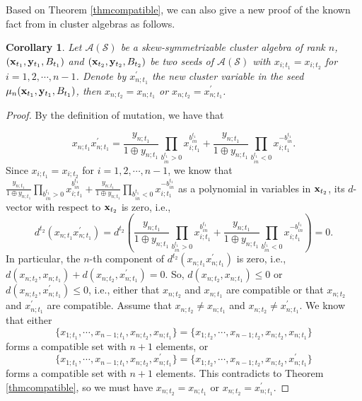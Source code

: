 \documentclass[14pt]{amsart}
\newtheorem{Corollary}[Theorem]{Corollary}
\begin{document}
Based on Theorem \ref{thmcompatible}, we can also give a new proof of the known fact  from \cite{GSV,CL} in cluster algebras as follows.
\begin{Corollary}
Let $\mathcal A(\mathcal S)$ be a skew-symmetrizable cluster algebra of rank $n$, $({\bf x}_{t_1},{\bf y}_{t_1}, B_{t_1})$ and  $({\bf x}_{t_2},{\bf y}_{t_2}, B_{t_2})$ be two seeds of  $\mathcal A(\mathcal S)$
with $x_{i;t_1}=x_{i;t_2}$ for $i=1,2,\cdots,n-1$. Denote by $x_{n;t_1}^\prime$  the new cluster variable in the seed $\mu_n({\bf x}_{t_1},{\bf y}_{t_1}, B_{t_1})$, then $x_{n;t_2}=x_{n;t_1}$ or $x_{n;t_2}=x_{n;t_1}^\prime$.
\end{Corollary}
\begin{proof}
By the definition of mutation, we have that

$$x_{n;t_1}x_{n;t_1}^\prime=\frac{y_{n;t_1}}{1\oplus y_{n;t_1}}\prod\limits_{b_{in}^{t_1}>0}x_{i;t_1}^{b_{in}^{t_1}}+\frac{y_{n;t_1}}{1\oplus y_{n;t_1}}\prod\limits_{b_{in}^{t_1}<0}x_{i;t_1}^{-b_{in}^{t_1}}.$$
  Since $x_{i;t_1}=x_{i;t_2}$ for $i=1,2,\cdots,n-1$, we know that $\frac{y_{n;t_1}}{1\oplus y_{n;t_1}}\prod\limits_{b_{in}^{t_1}>0}x_{i;t_1}^{b_{in}^{t_1}}+\frac{y_{n;t_1}}{1\oplus y_{n;t_1}}\prod\limits_{b_{in}^{t_1}<0}x_{i;t_1}^{-b_{in}^{t_1}}$ as a polynomial in variables in ${\bf x}_{t_2}$, its $d$-vector with respect to ${\bf x}_{t_2}$ is zero, i.e., $$d^{t_2}(x_{n;t_1}x_{n;t_1}^\prime)=d^{t_2}(\frac{y_{n;t_1}}{1\oplus y_{n;t_1}}\prod\limits_{b_{in}^{t_1}>0}x_{i;t_1}^{b_{in}^{t_1}}+\frac{y_{n;t_1}}{1\oplus y_{n;t_1}}\prod\limits_{b_{in}^{t_1}<0}x_{i;t_1}^{-b_{in}^{t_1}})=0.$$
In particular, the $n$-th component of $d^{t_2}(x_{n;t_1}x_{n;t_1}^\prime)$ is zero, i.e., $d(x_{n;t_2},x_{n;t_1})+d(x_{n;t_2},x_{n;t_1}^\prime)=0.$
So, $d(x_{n;t_2},x_{n;t_1})\leq 0$ or $d(x_{n;t_2},x_{n;t_1}^\prime)\leq 0$, i.e., either that $x_{n;t_2}$ and $x_{n;t_1}$ are compatible or that   $x_{n;t_2}$ and $x_{n;t_1}^\prime$ are compatible. Assume that $x_{n;t_2}\neq x_{n;t_1}$ and $x_{n;t_2}\neq x_{n;t_1}^\prime$. We know that either $$\{x_{1;t_1},\cdots,x_{n-1;t_1},x_{n;t_2},x_{n;t_1}\}=\{x_{1;t_2},\cdots,x_{n-1;t_2},x_{n;t_2},x_{n;t_1}\}$$ forms a compatible set with $n+1$ elements, or $$\{x_{1;t_1},\cdots,x_{n-1;t_1},x_{n;t_2},x_{n;t_1}^\prime\}=\{x_{1;t_2},\cdots,x_{n-1;t_2},x_{n;t_2},x_{n;t_1}^\prime\}$$
forms a compatible set with $n+1$ elements. This  contradicts to Theorem \ref{thmcompatible},  so we must have $x_{n;t_2}=x_{n;t_1}$ or $x_{n;t_2}=x_{n;t_1}^\prime$.
\end{proof}
\end{document}
